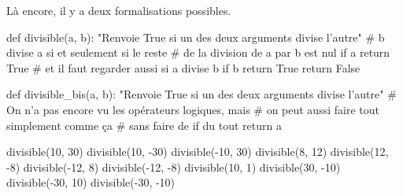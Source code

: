 \begin{solution}
Là encore, il y a deux formalisations possibles.

\begin{idleconsole}
\begin{pyconsole}
def divisible(a, b):
    "Renvoie True si un des deux arguments divise l'autre"
    # b divise a si et seulement si le reste
    # de la division de a par b est nul
    if a %
        return True
    # et il faut regarder aussi si a divise b
    if b %
        return True
    return False

def divisible_bis(a, b):
    "Renvoie True si un des deux arguments divise l'autre"
    # On n'a pas encore vu les opérateurs logiques, mais
    # on peut aussi faire tout simplement comme ça
    # sans faire de if du tout
    return a %

divisible(10, 30)
divisible(10, -30)
divisible(-10, 30)
divisible(8, 12)
divisible(12, -8)
divisible(-12, 8)
divisible(-12, -8)
divisible(10, 1)
divisible(30, -10)
divisible(-30, 10)
divisible(-30, -10)
\end{pyconsole}
\end{idleconsole}
\end{solution}




